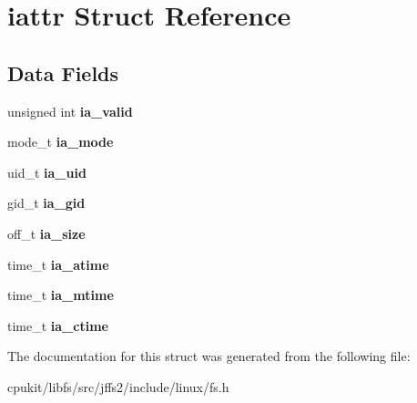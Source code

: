 \hypertarget{structiattr}{}\section{iattr Struct Reference}
\label{structiattr}
\subsection*{Data Fields}
\begin{DoxyCompactItemize}
\item 
\mbox{\label{structiattr_a16a15f5d94ebe0614fb54f47eadff583}} 
unsigned int {\bfseries ia\+\_\+valid}
\item 
\mbox{\label{structiattr_ab19d1bdcb18991570869855fccbc1739}} 
mode\+\_\+t {\bfseries ia\+\_\+mode}
\item 
\mbox{\label{structiattr_a9d32dfc24d29013dc436c9d751db8209}} 
uid\+\_\+t {\bfseries ia\+\_\+uid}
\item 
\mbox{\label{structiattr_a0bee052df34b98e4c293b984060f52b1}} 
gid\+\_\+t {\bfseries ia\+\_\+gid}
\item 
\mbox{\label{structiattr_a2bdf2661d9019c3c7b80ec27b48983c2}} 
off\+\_\+t {\bfseries ia\+\_\+size}
\item 
\mbox{\label{structiattr_a2e8ae000a99569f0ffcb0d17910dbe83}} 
time\+\_\+t {\bfseries ia\+\_\+atime}
\item 
\mbox{\label{structiattr_a67e281e04f7b130382453336311f0eef}} 
time\+\_\+t {\bfseries ia\+\_\+mtime}
\item 
\mbox{\label{structiattr_a7c6854174342ea6a01145d565dcb1a9a}} 
time\+\_\+t {\bfseries ia\+\_\+ctime}
\end{DoxyCompactItemize}


The documentation for this struct was generated from the following file\+:\begin{DoxyCompactItemize}
\item 
cpukit/libfs/src/jffs2/include/linux/fs.\+h\end{DoxyCompactItemize}
